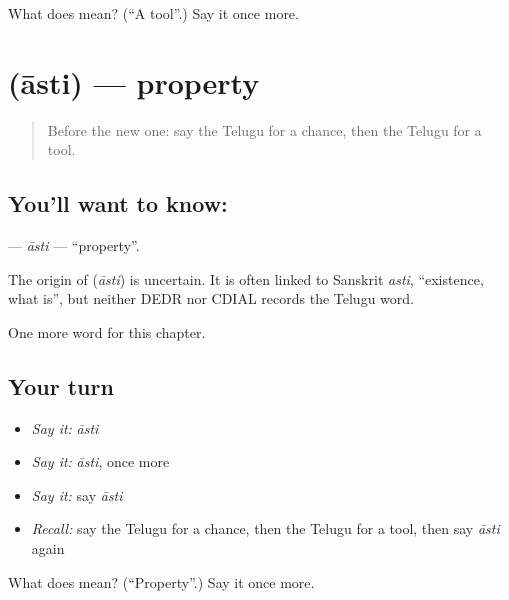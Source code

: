\begin{tcolorbox}[breakable,colback=teal!4,colframe=teal!35!black,title={Before you move on}]
What does  mean? (\textquotedblleft{}A tool\textquotedblright{}.) Say it once more.
\end{tcolorbox}
\section[\texorpdfstring{\te{ఆస్తి} (āsti)}{ఆస్తి (āsti)}]{ (āsti) — property}

\label{lesson:TE-C106-asti}



\begin{quote}
Before the new one: say the Telugu for a chance, then the Telugu for a tool.
\end{quote}

\subsection*{You'll want to know: }
\textbf{} — \emph{āsti} — \textquotedblleft{}property\textquotedblright{}.

\begin{cousinweb}
The origin of \textbf{} (\emph{āsti}) is uncertain. It is often linked to Sanskrit \emph{asti}, \textquotedblleft{}existence, what is\textquotedblright{}, but neither DEDR nor CDIAL records the Telugu word.
\end{cousinweb}

\begin{grammarlens}[title={What you've built}]
One more word for this chapter.
\end{grammarlens}

\subsection*{Your turn}
\begin{itemize}
\raggedright
  \item \emph{Say it:} \emph{āsti}
  \item \emph{Say it:} \emph{āsti}, once more
  \item \emph{Say it:} say \emph{āsti}
  \item \emph{Recall:} say the Telugu for a chance, then the Telugu for a tool, then say \emph{āsti} again
\end{itemize}

\begin{tcolorbox}[breakable,colback=teal!4,colframe=teal!35!black,title={Before you move on}]
What does  mean? (\textquotedblleft{}Property\textquotedblright{}.) Say it once more.
\end{tcolorbox}
